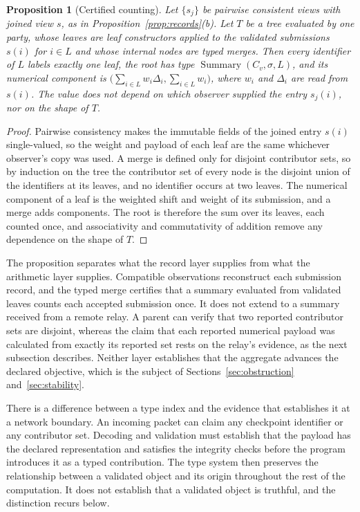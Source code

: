 \documentclass[11pt]{article}
\newtheorem{proposition}{Proposition}
\theoremstyle{definition}
\theoremstyle{remark}
\begin{document}
\begin{proposition}[Certified counting]\label{prop:counting}
Let $\{s_j\}$ be pairwise consistent views with joined view $s$, as in Proposition~\ref{prop:records}(b). Let $T$ be a tree evaluated by one party, whose leaves are leaf constructors applied to the validated submissions $s(i)$ for $i\in L$ and whose internal nodes are typed merges. Then every identifier of $L$ labels exactly one leaf, the root has type $\operatorname{Summary}(C_v,\sigma,L)$, and its numerical component is $\bigl(\sum_{i\in L}w_i\Delta_i,\sum_{i\in L}w_i\bigr)$, where $w_i$ and $\Delta_i$ are read from $s(i)$. The value does not depend on which observer supplied the entry $s_j(i)$, nor on the shape of $T$.
\end{proposition}

\begin{proof}
Pairwise consistency makes the immutable fields of the joined entry $s(i)$ single-valued, so the weight and payload of each leaf are the same whichever observer's copy was used. A merge is defined only for disjoint contributor sets, so by induction on the tree the contributor set of every node is the disjoint union of the identifiers at its leaves, and no identifier occurs at two leaves. The numerical component of a leaf is the weighted shift and weight of its submission, and a merge adds components. The root is therefore the sum over its leaves, each counted once, and associativity and commutativity of addition remove any dependence on the shape of $T$.
\end{proof}

The proposition separates what the record layer supplies from what the arithmetic layer supplies. Compatible observations reconstruct each submission record, and the typed merge certifies that a summary evaluated from validated leaves counts each accepted submission once. It does not extend to a summary received from a remote relay. A parent can verify that two reported contributor sets are disjoint, whereas the claim that each reported numerical payload was calculated from exactly its reported set rests on the relay's evidence, as the next subsection describes. Neither layer establishes that the aggregate advances the declared objective, which is the subject of Sections~\ref{sec:obstruction} and~\ref{sec:stability}.

There is a difference between a type index and the evidence that establishes it at a network boundary. An incoming packet can claim any checkpoint identifier or any contributor set. Decoding and validation must establish that the payload has the declared representation and satisfies the integrity checks before the program introduces it as a typed contribution. The type system then preserves the relationship between a validated object and its origin throughout the rest of the computation. It does not establish that a validated object is truthful, and the distinction recurs below.
\end{document}
